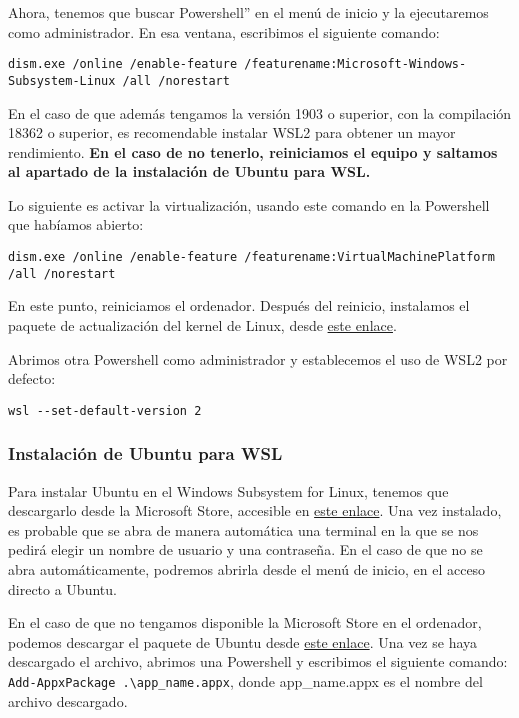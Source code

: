 Ahora, tenemos que buscar Powershell'' en el menú de inicio y la ejecutaremos como administrador. En esa ventana, escribimos el siguiente comando:

\texttt{dism.exe /online /enable-feature \newline
/featurename:Microsoft-Windows-Subsystem-Linux /all /norestart}

En el caso de que además tengamos la versión 1903 o superior, con la compilación 18362 o superior, es recomendable instalar WSL2 para obtener un mayor rendimiento. \textbf{En el caso de no tenerlo, reiniciamos el equipo y saltamos al apartado de la instalación de Ubuntu para WSL.}

Lo siguiente es activar la virtualización, usando este comando en la Powershell que habíamos abierto:

\texttt{dism.exe /online /enable-feature \newline
/featurename:VirtualMachinePlatform /all /norestart}

En este punto, reiniciamos el ordenador. Después del reinicio, instalamos el paquete de actualización del kernel de Linux, desde \href{https://wslstorestorage.blob.core.windows.net/wslblob/wsl_update_x64.msi}{este enlace}.

Abrimos otra Powershell como administrador y establecemos el uso de WSL2 por defecto:

\texttt{wsl -{}-set-default-version 2}

\subsubsection{Instalación de Ubuntu para WSL}
Para instalar Ubuntu en el Windows Subsystem for Linux, tenemos que descargarlo desde la Microsoft Store, accesible en \href{https://www.microsoft.com/es-es/p/ubuntu/9nblggh4msv6}{este enlace}. Una vez instalado, es probable que se abra de manera automática una terminal en la que se nos pedirá elegir un nombre de usuario y una contraseña. En el caso de que no se abra automáticamente, podremos abrirla desde el menú de inicio, en el acceso directo a Ubuntu.

En el caso de que no tengamos disponible la Microsoft Store en el ordenador, podemos descargar el paquete de Ubuntu desde \href{https://aka.ms/wslubuntu2004}{este enlace}. Una vez se haya descargado el archivo, abrimos una Powershell y escribimos el siguiente comando: \texttt{Add-AppxPackage .\textbackslash app\_name.appx}, donde app\_name.appx es el nombre del archivo descargado.

